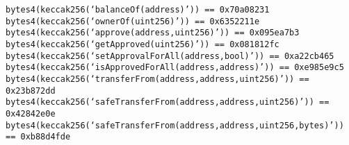 \begin{lstlisting}[language=Solidity, basicstyle=\scriptsize]
bytes4(keccak256(‘balanceOf(address)’)) == 0x70a08231
bytes4(keccak256(‘ownerOf(uint256)’)) == 0x6352211e
bytes4(keccak256(‘approve(address,uint256)’)) == 0x095ea7b3
bytes4(keccak256(‘getApproved(uint256)’)) == 0x081812fc
bytes4(keccak256(‘setApprovalForAll(address,bool)’)) == 0xa22cb465
bytes4(keccak256(‘isApprovedForAll(address,address)’)) == 0xe985e9c5
bytes4(keccak256(‘transferFrom(address,address,uint256)’)) == 0x23b872dd
bytes4(keccak256(‘safeTransferFrom(address,address,uint256)’)) == 0x42842e0e
bytes4(keccak256(‘safeTransferFrom(address,address,uint256,bytes)’)) == 0xb88d4fde
\end{lstlisting}